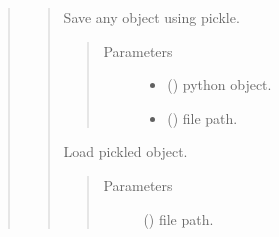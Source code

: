 \documentclass[letterpaper,10pt,english]{sphinxmanual}
\begin{document}
\begin{quote}
\begin{quote}
\begin{fulllineitems}
\begin{fulllineitems}
\begin{quote}
\begin{description}
\end{description}\end{quote}

\end{fulllineitems}


\end{fulllineitems}


\begin{fulllineitems}
\label{\detokenize{modules/celloracle.utility:celloracle.utility.save_as_pickled_object}}
Save any object using pickle.
\begin{quote}\begin{description}
\item[{Parameters}] \leavevmode\begin{itemize}
\item {} 
 () \textendash{} python object.

\item {} 
 () \textendash{} file path.

\end{itemize}

\end{description}\end{quote}

\end{fulllineitems}


\begin{fulllineitems}
\label{\detokenize{modules/celloracle.utility:celloracle.utility.load_pickled_object}}
Load pickled object.
\begin{quote}\begin{description}
\item[{Parameters}] \leavevmode
{} () \textendash{} file path.


\end{description}
\end{quote}
\end{fulllineitems}
\end{quote}
\end{quote}
\end{document}
